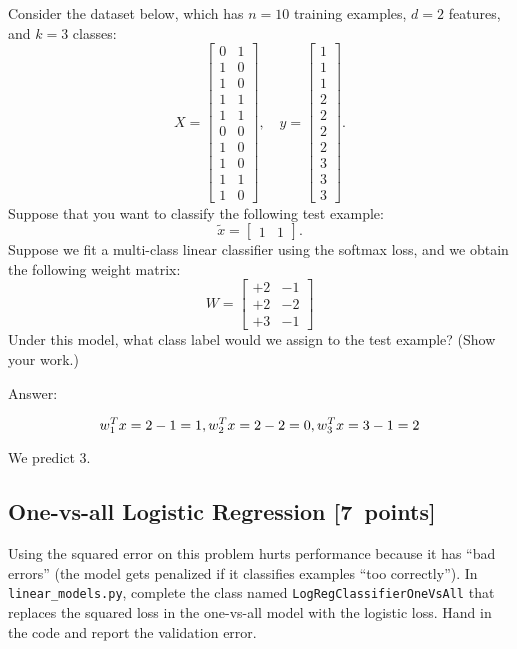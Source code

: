 \documentclass{article}
\newcommand{\blu}[1]{{\textcolor{blu}{#1}}}
\newenvironment{answer}{\par\begingroup\color{gre}Answer: }{\endgroup}
\let\ask\blu
\newcommand\pts[1]{\textcolor{pointscolour}{[#1~points]}}
\begin{document}
Consider the dataset below, which has $n=10$ training examples, $d=2$ features, and $k=3$ classes:
\[
X = \begin{bmatrix}0 & 1\\1 & 0\\ 1 & 0\\ 1 & 1\\ 1 & 1\\ 0 & 0\\  1 & 0\\  1 & 0\\  1 & 1\\  1 &0\end{bmatrix}, \quad y = \begin{bmatrix}1\\1\\1\\2\\2\\2\\2\\3\\3\\3\end{bmatrix}.
\]
Suppose that you want to classify the following test example:
\[
\tilde{x} = \begin{bmatrix}1 & 1\end{bmatrix}.
\]
Suppose we fit a multi-class linear classifier using the softmax loss, and we obtain the following weight matrix:
\[
W =
\begin{bmatrix}
+2 & -1\\
+2 & -2\\
+3 & -1
\end{bmatrix}
\]
\ask{Under this model, what class label would we assign to the test example? (Show your work.)}
\begin{answer}
    
\[
w_1^T x = 2 - 1 =  1, \\
w_2^T x = 2 - 2 =  0, \\
w_3^T x = 3 - 1 =  2
\]

We predict 3.

\end{answer}
\subsection{One-vs-all Logistic Regression \pts{7}}

Using the squared error on this problem hurts performance because it has ``bad errors'' (the model gets penalized if it classifies examples ``too correctly''). In \verb|linear_models.py|, complete the class named \verb|LogRegClassifierOneVsAll| that replaces the squared loss in the one-vs-all model with the logistic loss. \ask{Hand in the code and report the validation error}.
\end{document}
